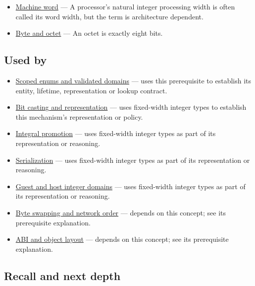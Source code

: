 \hypertarget{appendix-cc04044b5782-prerequisites}{}

\begin{itemize}
\tightlist
\item
  \hyperref[appendix-d67a19507dc5]{Machine word} --- A processor's natural integer processing width is often called its word width, but the term is architecture dependent.
\item
  \hyperref[appendix-5bee2df85484]{Byte and octet} --- An octet is exactly eight bits.
\end{itemize}

\subsection{Used by}\label{appendix-cc04044b5782-used-by}

\hypertarget{appendix-cc04044b5782-used-by}{}

\begin{itemize}
\tightlist
\item
  \hyperref[appendix-23640fcee147]{Scoped enums and validated domains} --- uses this prerequisite to establish its entity, lifetime, representation or lookup contract.
\item
  \hyperref[appendix-34ee45f161c1]{Bit casting and representation} --- uses fixed-width integer types to establish this mechanism's representation or policy.
\item
  \hyperref[appendix-45303d03796a]{Integral promotion} --- uses fixed-width integer types as part of its representation or reasoning.
\item
  \hyperref[appendix-91d09ebed979]{Serialization} --- uses fixed-width integer types as part of its representation or reasoning.
\item
  \hyperref[appendix-33e7a011b684]{Guest and host integer domains} --- uses fixed-width integer types as part of its representation or reasoning.
\item
  \hyperref[appendix-11ba36693aa2]{Byte swapping and network order} --- depends on this concept; see its prerequisite explanation.
\item
  \hyperref[appendix-c4ac6bb0fff8]{ABI and object layout} --- depends on this concept; see its prerequisite explanation.
\end{itemize}

\subsection{Recall and next depth}\label{appendix-cc04044b5782-recall-and-next-depth}

